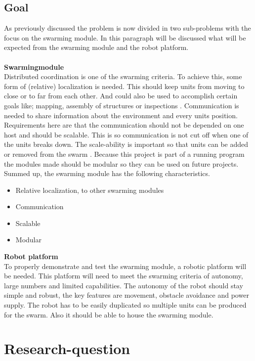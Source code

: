 \documentclass[10pt,a4paper]{article}
\begin{document}
\subsection{Goal}
As previously discussed the problem is now divided in two sub-problems with the focus on the swarming module. In this paragraph will be discussed what will be expected from the swarming module and the robot platform.\\\\ \textbf{Swarmingmodule}\\
Distributed coordination is one of the swarming criteria. To achieve this, some form of (relative) localization is needed. This should keep units from moving to close or to far from each other. And could also be used to accomplish certain goals like;  mapping, assembly of structures or inspections \cite{networkedRS}. Communication is needed to share information about the environment and every units position. Requirements here are that the communication should not be depended on one host and should be scalable. This is so communication is not cut off when one of the units breaks down. The scale-ability is important so that units can be added or removed from the swarm \cite{multidomaincom}. Because this project is part of a running program the modules made should be modular so they can be used on future projects. Summed up, the swarming module has the following characteristics.

\begin{itemize}
\item Relative localization, to other swarming modules
\item Communication
\item Scalable
\item Modular
\end{itemize} 
\textbf{Robot platform}\\
To properly demonstrate and test the swarming module, a robotic platform will be needed. This platform will need to meet the swarming criteria of autonomy, large numbers and limited capabilities. The autonomy of the robot should stay simple and robust, the key features are movement, obstacle avoidance and power supply. The robot has to be easily duplicated so multiple units can be produced for the swarm. Also it should be able to house the swarming module.

\section{Research-question}
\end{document}
